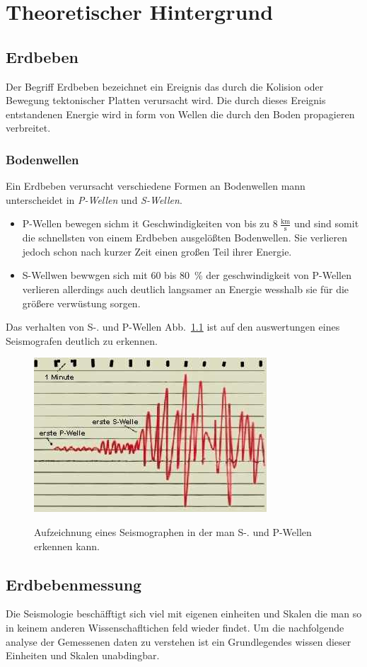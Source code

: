 \documentclass[class=scrbook, crop=false]{standalone}
\begin{document}
\ifstandalone

    
\fi

\chapter{Theoretischer Hintergrund}
\section{Erdbeben}
Der Begriff Erdbeben bezeichnet ein Ereignis das durch die Kolision oder Bewegung tektonischer Platten verursacht wird. Die durch dieses Ereignis entstandenen Energie wird in form von Wellen die durch den Boden propagieren verbreitet.
\subsection{Bodenwellen}
Ein Erdbeben verursacht verschiedene Formen an Bodenwellen mann unterscheidet in  \textit{P-Wellen} und \textit{S-Wellen}.\\
\begin{itemize}
\item
P-Wellen bewegen sichm it Geschwindigkeiten von bis zu $8~\mathrm{\frac{km}{s}}$  und sind somit die schnellsten von einem Erdbeben ausgelößten Bodenwellen. Sie verlieren jedoch schon nach kurzer Zeit einen großen Teil ihrer Energie.
\item
S-Wellwen bewwgen sich mit 60 bis 80~\% der geschwindigkeit von P-Wellen verlieren allerdings auch deutlich langsamer an Energie wesshalb sie für die größere verwüstung sorgen.
\end{itemize}
Das verhalten von S-. und P-Wellen Abb.~\ref{fig: wellen} ist auf den auswertungen eines Seismografen deutlich zu erkennen.
\begin{figure}[h]
	\includegraphics[width=0.\textwidth]{images/theory/aufzeichnungMechanwellAus.jpg}
	\label{fig: wellen}
	\caption{Aufzeichnung eines Seismographen in der man S-. und P-Wellen erkennen kann.}

\end{figure}

\section{Erdbebenmessung}
Die Seismologie beschäfftigt sich viel mit eigenen einheiten und Skalen die man so in keinem anderen Wissenschafltichen feld wieder findet. Um die nachfolgende analyse der Gemessenen daten zu verstehen ist ein Grundlegendes wissen dieser Einheiten und Skalen unabdingbar.
\end{document}
